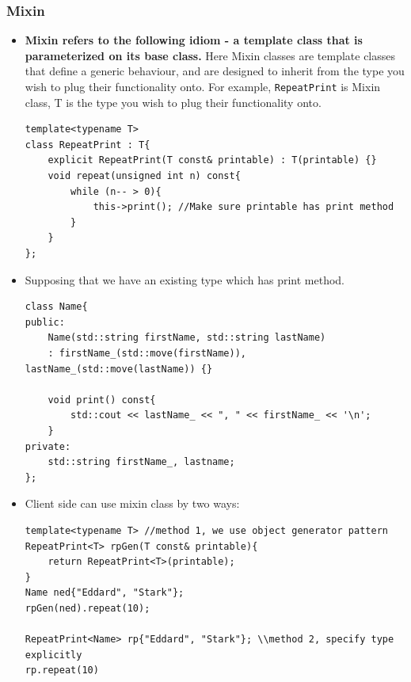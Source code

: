 \documentclass[a4paper,11pt,twoside]{book}
\begin{document}
\subsubsection{Mixin}
\begin{itemize}
	
	\item \textbf{Mixin refers to the following idiom - a template class that is parameterized on its base class.} Here Mixin classes are template classes that define a generic behaviour, and are designed to inherit from the type you wish to plug their functionality onto. For example, \texttt{RepeatPrint} is Mixin class, T is the type you wish to plug their functionality onto.
\begin{lstlisting}[numbers=none]
template<typename T>
class RepeatPrint : T{
	explicit RepeatPrint(T const& printable) : T(printable) {}
	void repeat(unsigned int n) const{
		while (n-- > 0){
			this->print(); //Make sure printable has print method
		}
	}
};
\end{lstlisting}
	
	\item Supposing that we have an existing type which has print method.
\begin{lstlisting}[numbers=none]
class Name{
public:
	Name(std::string firstName, std::string lastName)
	: firstName_(std::move(firstName)), lastName_(std::move(lastName)) {}
	
	void print() const{
		std::cout << lastName_ << ", " << firstName_ << '\n';
	}
private:
	std::string firstName_, lastname;
};
\end{lstlisting}
	
	\item Client side can use mixin class by two ways:
\begin{lstlisting}[numbers=none]
template<typename T> //method 1, we use object generator pattern
RepeatPrint<T> rpGen(T const& printable){
	return RepeatPrint<T>(printable);
}
Name ned{"Eddard", "Stark"};    
rpGen(ned).repeat(10);

RepeatPrint<Name> rp{"Eddard", "Stark"}; \\method 2, specify type explicitly
rp.repeat(10)
\end{lstlisting}

\end{itemize}
\end{document}
